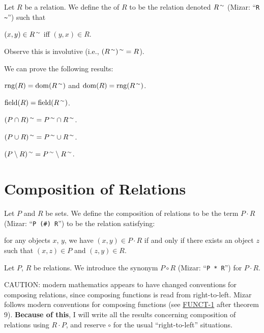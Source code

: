 \documentclass{article}
\begin{document}
\begin{definition}
Let $R$ be a relation. We define the  of $R$
to be the relation denoted $R^{\,\sim}$ (Mizar: ``\verb#R ~#'') such that
\begin{defn}
\item $(x,y)\in R^{\,\sim}$ iff $(y,x)\in R$.
\end{defn}
Observe this is involutive (i.e., $(R^{\,\sim})^{\,\sim}=R$).
\end{definition}

We can prove the following results:
\begin{thm}
\item\label{relat1:20} $\operatorname{rng}(R)=\operatorname{dom}(R^{\,\sim})$ and
  $\operatorname{dom}(R)=\operatorname{rng}(R^{\,\sim})$.
\item\label{relat1:21} $\operatorname{field}(R)=\operatorname{field}(R^{\,\sim})$.
\item\label{relat1:22} $(P\cap R)^{\,\sim}=P^{\,\sim}\cap R^{\,\sim}$.
\item\label{relat1:23} $(P\cup R)^{\,\sim}=P^{\,\sim}\cup R^{\,\sim}$.
\item\label{relat1:24} $(P\setminus R)^{\,\sim}=P^{\,\sim}\setminus R^{\,\sim}$.
\end{thm}

\section{Composition of Relations}

\begin{definition}
Let $P$ and $R$ be sets. We define the composition of relations to be
the term $P\cdot R$ (Mizar: ``\verb|P (#) R|'') to be the relation satisfying:
\begin{defn}
\item for any objects $x$, $y$, we have $(x,y)\in P\cdot R$ if and only
  if there exists an object $z$ such that $(x,z)\in P$ and $(z,y)\in R$.
\end{defn}
\end{definition}

\begin{notation}
Let $P$, $R$ be relations. We introduce the synonym $P\circ R$ (Mizar:
``\verb#P * R#'') for $P\cdot R$.
\end{notation}

\begin{remark}
CAUTION: modern mathematics appears to have changed conventions for
composing relations, since composing functions is read from right-to-left.
Mizar follows modern conventions for composing functions (see
\hyperlink{notation:funct1:composition}{FUNCT-1} after theorem 9).
\textbf{Because of this}, I will write all the results concerning
composition of relations using $R\cdot P$, and reserve $\circ$ for the
usual ``right-to-left'' situations.
\end{remark}
\end{document}
